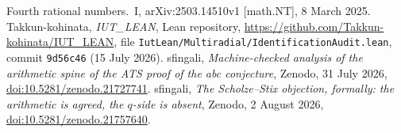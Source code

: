 \documentclass[11pt]{article}
\theoremstyle{remark}
\begin{document}
\begin{thebibliography}{Fourth}
{rational numbers.~I}, arXiv:2503.14510v1 [math.NT], 8 March 2025.
 Takkun-kohinata, \emph{IUT\_LEAN}, Lean repository,
\url{https://github.com/Takkun-kohinata/IUT_LEAN}, file
\texttt{IutLean/Multiradial/IdentificationAudit.lean}, commit \texttt{9d56c46}
(15 July 2026).
 sfingali,
\emph{Machine-checked analysis of the arithmetic spine of the ATS proof of the abc
conjecture}, Zenodo, 31 July 2026,
\href{https://doi.org/10.5281/zenodo.21727741}{doi:10.5281/zenodo.21727741}.
 sfingali,
\emph{The Scholze--Stix objection, formally: the arithmetic is agreed, the $q$-side is
absent}, Zenodo, 2 August 2026,
\href{https://doi.org/10.5281/zenodo.21757640}{doi:10.5281/zenodo.21757640}.
\end{thebibliography}
\end{document}
